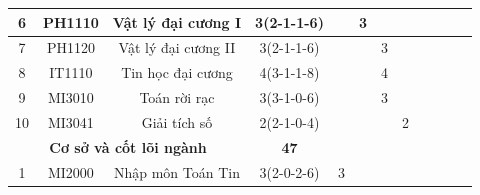 \documentclass[12pt,a4paper]{report}
\begin{document}
\begin{landscape}
\begin{longtable}[c]{|c|c|c|c|c|c|c|c|c|c|c|c|}
        6                             & PH1110                          & Vật lý đại cương I                                           & 3(2-1-1-6)                                                                           &             & 3           &             &             &             &             &             &             \\ \hline
        7                             & PH1120                          & Vật lý đại cương II                                          & 3(2-1-1-6)                                                                           &             &             & 3           &             &             &             &             &             \\ \hline
        8                             & IT1110                          & Tin học đại cương                                            & 4(3-1-1-8)                                                                           &             &             & 4           &             &             &             &             &             \\ \hline
        9                             & MI3010                          & Toán rời rạc                                                 & 3(3-1-0-6)                                                                           &             &             & 3           &             &             &             &             &             \\ \hline
        10                            & MI3041                          & Giải tích số                                                 & 2(2-1-0-4)                                                                           &             &             &             & 2           &             &             &             &             \\ \hline
        \multicolumn{3}{|c|}{\textbf{Cơ sở và cốt lõi ngành}}                                                                          & \textbf{47}                                                                          &             &             &             &             &             &             &             &             \\ \hline
        1                             & MI2000                          & Nhập môn Toán Tin                                            & 3(2-0-2-6)                                                                           & 3           &             &             &             &             &             &             &             \\ \hline

\end{longtable}
\end{landscape}
\end{document}
